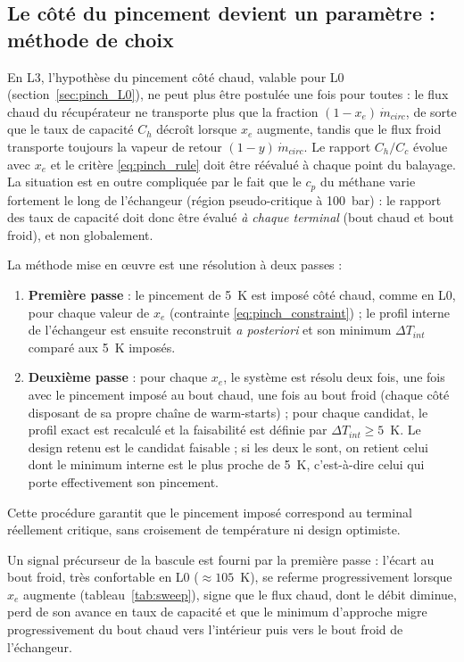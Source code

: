 \subsection{Le côté du pincement devient un paramètre : méthode de choix}
\label{sec:choix_pinch}

En L3, l'hypothèse du pincement côté chaud, valable pour L0
(section~\ref{sec:pinch_L0}), ne peut plus être postulée une fois pour
toutes : le flux chaud du récupérateur ne transporte plus que la fraction
$(1 - x_e)\,\dot m_{circ}$, de sorte que le taux de capacité $C_h$
décroît lorsque $x_e$ augmente, tandis que le flux froid transporte toujours
la vapeur de retour $(1 - y)\,\dot m_{circ}$. Le rapport $C_h/C_c$ évolue
avec $x_e$ et le critère \eqref{eq:pinch_rule} doit être réévalué à chaque
point du balayage. La situation est en outre compliquée par le fait que le
$c_p$ du méthane varie fortement le long de l'échangeur (région
pseudo-critique à 100~bar) : le rapport des taux de capacité doit donc être
évalué \emph{à chaque terminal} (bout chaud et bout froid), et non
globalement.

La méthode mise en \oe uvre est une résolution à deux passes :
\begin{enumerate}
  \item \textbf{Première passe} : le pincement de 5~K est imposé côté chaud,
        comme en L0, pour chaque valeur de $x_e$ (contrainte
        \eqref{eq:pinch_constraint}) ; le profil interne de l'échangeur est
        ensuite reconstruit \emph{a posteriori} et son minimum
        $\Delta T_{int}$ comparé aux 5~K imposés.
  \item \textbf{Deuxième passe} : pour chaque $x_e$, le système est résolu
        deux fois, une fois avec le pincement imposé au bout chaud, une fois
        au bout froid (chaque côté disposant de sa propre chaîne de
        warm-starts) ; pour chaque candidat, le profil exact est recalculé
        et la faisabilité est définie par $\Delta T_{int} \geq 5$~K. Le
        design retenu est le candidat faisable ; si les deux le sont, on
        retient celui dont le minimum interne est le plus proche de 5~K,
        c'est-à-dire celui qui porte effectivement son pincement.
\end{enumerate}
Cette procédure garantit que le pincement imposé correspond au terminal
réellement critique, sans croisement de température ni design optimiste.

Un signal précurseur de la bascule est fourni par la première passe : l'écart
au bout froid, très confortable en L0 ($\approx 105$~K), se referme
progressivement lorsque $x_e$ augmente (tableau~\ref{tab:sweep}), signe que
le flux chaud, dont le débit diminue, perd de son avance en taux de capacité
et que le minimum d'approche migre progressivement du bout chaud vers
l'intérieur puis vers le bout froid de l'échangeur.

